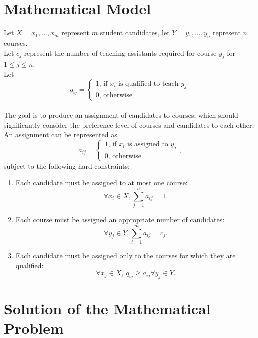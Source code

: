 \documentclass[twoside,twocolumn]{article}
\begin{document}
    \section{Mathematical Model}
    Let $X = {x_1,...,x_m}$ represent $m$ student candidates, let $Y = {y_1,...,y_n}$ represent $n$ courses. \\
    Let $c_j$ represent the number of teaching assistants required for course $y_j$ for $1 \leq j \leq n$. \\
    Let $$q_{ij} = \begin{cases}1\text{, if $x_i$ is qualified to teach $y_j$} \\ 0\text{, otherwise} \end{cases}$$ \\
    The goal is to produce an assignment of candidates to courses, which should significantly consider the preference level of courses and candidates
    to each other. An assignment can be represented as 
    $$a_{ij} = \begin{cases}1\text{, if $x_i$ is assigned to $y_j$} \\ 0\text{, otherwise} \end{cases}\text{,}$$ 
    subject to the following hard constraints:
    \begin{enumerate}
        \item Each candidate must be assigned to at most one course: $$\forall x_i \in X, \sum_{j = 1}^n a_{ij} = 1\text{.}$$
        \item Each course must be assigned an appropriate number of candidates: $$\forall y_j \in Y, \sum_{i = 1}^m a_{ij} = c_j\text{.}$$
        \item Each candidate must be assigned only to the courses for which they are qualified: $$\forall x_j \in X,\ q_{ij} \geq a_{ij} \forall y_j \in Y\text{.}$$
    \end{enumerate}
    \section{Solution of the Mathematical Problem}
\end{document}
